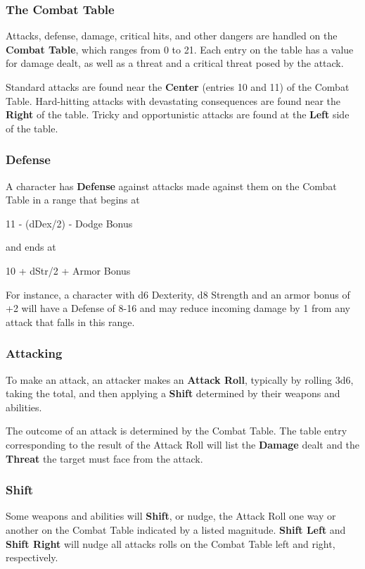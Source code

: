 \documentclass[10pt,twoside,twocolumn,openany]{book}
\begin{document}
\subsubsection{The Combat Table}
Attacks, defense, damage, critical hits, and other dangers are handled on the \textbf{Combat Table}, which ranges from 0 to 21. Each entry on the table has a value for damage dealt, as well as a threat and a critical threat posed by the attack.

Standard attacks are found near the \textbf{Center} (entries 10 and 11) of the Combat Table. Hard-hitting attacks with devastating consequences are found near the \textbf{Right} of the table. Tricky and opportunistic attacks are found at the \textbf{Left} side of the table.

\subsubsection{Defense}
A character has \textbf{Defense} against attacks made against them on the Combat Table in a range that begins at
\begin{center} 11 - (dDex/2) - Dodge Bonus \end{center}
\noindent and ends at
\begin{center} 10 + dStr/2 + Armor Bonus \end{center}
For instance, a character with d6 Dexterity, d8 Strength and an armor bonus of +2 will have a Defense of 8-16 and may reduce incoming damage by 1 from any attack that falls in this range.

\subsubsection{Attacking}
To make an attack, an attacker makes an \textbf{Attack Roll}, typically by rolling 3d6, taking the total, and then applying a \textbf{Shift} determined by their weapons and abilities.

The outcome of an attack is determined by the Combat Table. The table entry corresponding to the result of the Attack Roll will list the \textbf{Damage} dealt and the \textbf{Threat} the target must face from the attack.

\subsubsection{Shift}
Some weapons and abilities will \textbf{Shift}, or nudge, the Attack Roll one way or another on the Combat Table indicated by a listed magnitude. \textbf{Shift Left} and \textbf{Shift Right} will nudge all attacks rolls on the Combat Table left and right, respectively.
\end{document}

